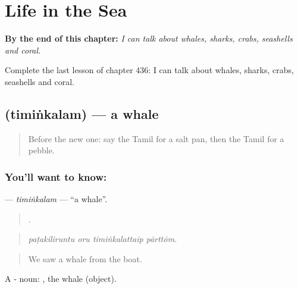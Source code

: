 
\chapter{Life in the Sea}
\label{ch:ta-life-in-the-sea}

\begin{chapteropening}
\textbf{By the end of this chapter:} \emph{I can talk about whales, sharks, crabs, seashells and coral.}

Complete the last lesson of chapter 436: I can talk about whales, sharks, crabs, seashells and coral.
\end{chapteropening}

\section[\texorpdfstring{\ta{திமிங்கலம்} (timiṅkalam)}{திமிங்கலம் (timiṅkalam)}]{ (timiṅkalam) — a whale}

\label{lesson:TA-C436-timinkalam}



\begin{quote}
Before the new one: say the Tamil for a salt pan, then the Tamil for a pebble.
\end{quote}

\subsection*{You'll want to know: }
\textbf{} — \emph{timiṅkalam} — \textquotedblleft{}a whale\textquotedblright{}.

\begin{quote}
   .
\end{quote}

\begin{quote}
\emph{paṭakiliruntu oru timiṅkalattaip pārttōm.}
\end{quote}

\begin{quote}
We saw a whale from the boat.
\end{quote}

A - noun: , the whale (object).

